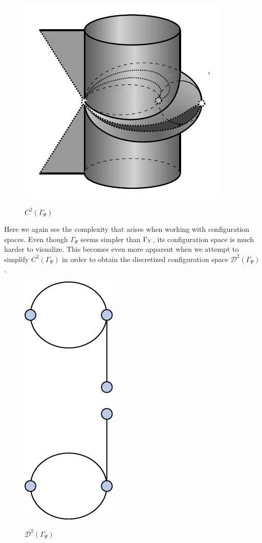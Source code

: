 \begin{figure}[h]
\centering
\caption{$C^2(\Gamma_{\Psi})$\cite{factory}}
\includegraphics[scale=.5]{Bad_C.png}
\label{fig:C_Psi}
\end{figure}

Here we again see the complexity that arises when working with configuration spaces. Even though $\Gamma_{\Psi}$ seems simpler than $\Gamma_Y$, its configuration space is much harder to visualize. This becomes even more apparent when we attempt to simplify $C^2(\Gamma_{\Psi})$ in order to obtain the discretized configuration space $\mathcal{D}^2(\Gamma_{\Psi})$. 

\begin{figure}[h]
\centering
\caption{$\mathcal{D}^2(\Gamma_{\Psi})$}
\includegraphics[scale=.5]{Bad_D.png}
\label{fig:D_Psi}
\end{figure}

